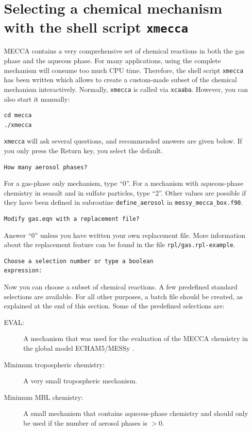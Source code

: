 \documentclass[twoside]{article}
\begin{document}
\section{Selecting a chemical mechanism with the shell script {\tt xmecca}}
\label{sec:xmecca}

MECCA contains a very comprehensive set of chemical reactions in both
the gas phase and the aqueous phase. For many applications, using the
complete mechanism will consume too much CPU time. Therefore, the shell
script \verb|xmecca| has been written which allows to create a
custom-made subset of the chemical mechanism interactively. Normally,
\verb|xmecca| is called via \verb|xcaaba|. However, you can also start
it manually:
\begin{verbatim}
cd mecca
./xmecca
\end{verbatim}
\verb|xmecca| will ask several questions, and recommended answers are
given below. If you only press the Return key, you select the default.
\begin{verbatim}
How many aerosol phases?
\end{verbatim}
For a gas-phase only mechanism, type ``0''. For a mechanism with
aqueous-phase chemistry in seasalt and in sulfate particles, type ``2''.
Other values are possible if they have been defined in subroutine
\verb|define_aerosol| in \verb|messy_mecca_box.f90|.
\begin{verbatim}
Modify gas.eqn with a replacement file?
\end{verbatim}
Answer ``0'' unless you have written your own replacement file. More
information about the replacement feature can be found in the file
\verb|rpl/gas.rpl-example|.
\begin{verbatim}
Choose a selection number or type a boolean
expression:
\end{verbatim}
Now you can choose a subset of chemical reactions. A few predefined
standard selections are available. For all other purposes, a batch file
should be created, as explained at the end of this section. Some of the
predefined selections are:
\begin{description}
\item [EVAL:] A mechanism that was used for the evaluation of the MECCA
  chemistry in the global model ECHAM5/MESSy \citep{1851}.
\item [Minimum tropospheric chemistry:] A very small tropospheric
  mechanism.
\item [Minimum MBL chemistry:] A small mechanism that contains
  aqueous-phase chemistry and should only be used if the number of
  aerosol phases is $>0$.
\end{description}
\end{document}
